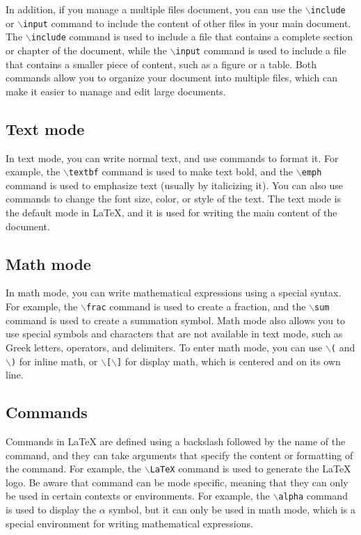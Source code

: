 In addition, if you manage a multiple files document, you can use the \texttt{\(\backslash\)include} or \texttt{\(\backslash\)input} command to include the content of other files in your main document. The \texttt{\(\backslash\)include} command is used to include a file that contains a complete section or chapter of the document, while the \texttt{\(\backslash\)input} command is used to include a file that contains a smaller piece of content, such as a figure or a table. Both commands allow you to organize your document into multiple files, which can make it easier to manage and edit large documents.

\subsection{Text mode}

In text mode, you can write normal text, and use commands to format it. For example, the \texttt{\(\backslash\)textbf} command is used to make text bold, and the \texttt{\(\backslash\)emph} command is used to emphasize text (usually by italicizing it). You can also use commands to change the font size, color, or style of the text. The text mode is the default mode in LaTeX, and it is used for writing the main content of the document.

\subsection{Math mode}

In math mode, you can write mathematical expressions using a special syntax. For example, the \texttt{\(\backslash\)frac} command is used to create a fraction, and the \texttt{\(\backslash\)sum} command is used to create a summation symbol. Math mode also allows you to use special symbols and characters that are not available in text mode, such as Greek letters, operators, and delimiters. To enter math mode, you can use \texttt{\(\backslash\)(} and \texttt{\(\backslash\))} for inline math, or \texttt{\(\backslash\)[\(\backslash\)]} for display math, which is centered and on its own line.

\subsection{Commands}

Commands in LaTeX are defined using a backslash followed by the name of the command, and they can take arguments that specify the content or formatting of the command. For example, the \texttt{\(\backslash\)LaTeX} command is used to generate the LaTeX logo. Be aware that command can be mode specific, meaning that they can only be used in certain contexts or environments. For example, the \texttt{\(\backslash\)alpha} command is used to display the \(\alpha\) symbol, but it can only be used in math mode, which is a special environment for writing mathematical expressions.

